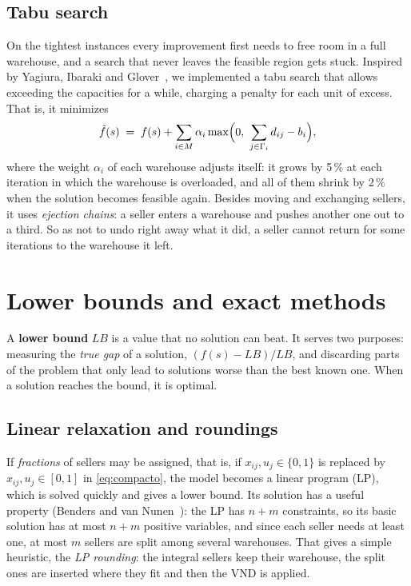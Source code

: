 \documentclass[11pt,a4paper]{article}
\begin{document}
\subsection{Tabu search}
On the tightest instances every improvement first needs to free room in a full warehouse, and a
search that never leaves the feasible region gets stuck. Inspired by Yagiura, Ibaraki and
Glover~\cite{yagiura2004}, we implemented a tabu search that allows exceeding the capacities for a
while, charging a penalty for each unit of excess. That is, it minimizes
\[
  \tilde f(s) \;=\; f(s) + \sum_{i\in M} \alpha_i \max\Bigl(0,\ \sum_{j\in\Gamma_i} d_{ij} - b_i\Bigr),
\]
where the weight $\alpha_i$ of each warehouse adjusts itself: it grows by 5\,\% at each iteration
in which the warehouse is overloaded, and all of them shrink by 2\,\% when the solution becomes
feasible again. Besides moving and exchanging sellers, it uses \emph{ejection chains}: a seller
enters a warehouse and pushes another one out to a third. So as not to undo right away what it
did, a seller cannot return for some iterations to the warehouse it left.

\section{Lower bounds and exact methods}\label{sec:exactos}
A \textbf{lower bound} $LB$ is a value that no solution can beat. It serves two purposes: measuring
the \emph{true gap} of a solution, $(f(s)-LB)/LB$, and discarding parts of the problem that only
lead to solutions worse than the best known one. When a solution reaches the bound, it is optimal.

\subsection{Linear relaxation and roundings}
If \emph{fractions} of sellers may be assigned, that is, if $x_{ij},u_j\in\{0,1\}$ is replaced by
$x_{ij},u_j\in[0,1]$ in \eqref{eq:compacto}, the model becomes a linear program (LP), which is
solved quickly and gives a lower bound. Its solution has a useful property (Benders and van
Nunen~\cite{benders1983}): the LP has $n+m$ constraints, so its basic solution has at most $n+m$
positive variables, and since each seller needs at least one, at most $m$ sellers are split among
several warehouses. That gives a simple heuristic, the \emph{LP rounding}: the integral sellers
keep their warehouse, the split ones are inserted where they fit and then the VND is applied.
\end{document}
